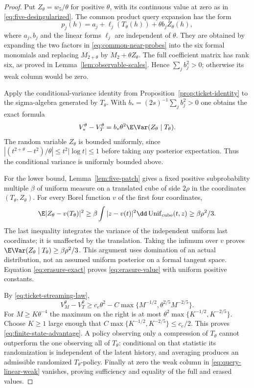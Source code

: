 \begin{proof}
Put $Z_\theta=w_5/\theta$ for positive $\theta$, with its continuous
value at zero as in \eqref{eq:five-desingularized}. The common product
query expansion has the form
\begin{equation}\label{eq:query-linear-weak}
 p_j(h)=a_j+\ell_j(T_\theta(h))+\theta b_jZ_\theta(h),
\end{equation}
where $a_j,b_j$ and the linear forms $\ell_j$ are independent of
$\theta$. They are obtained by expanding the two factors in
\eqref{eq:common-near-probes} into the six formal monomials and replacing
$M_{2+\theta}$ by $M_2+\theta Z_\theta$. The full coefficient matrix
has rank six, as proved in Lemma~\ref{lem:observable-scales}. Hence
$\sum_jb_j^2>0$; otherwise its weak column would be zero.

Apply the conditional-variance identity from
Proposition~\ref{prop:ticket-identity} to the sigma-algebra generated by
$T_\theta$. With $b_*=(2s)^{-1}\sum_jb_j^2>0$ one obtains the exact
formula
\begin{equation}\label{eq:erasure-exact}
 V_*^\theta-V_T^\theta
       =b_*\theta^2\E\Var(Z_\theta\mid T_\theta).
\end{equation}
The random variable $Z_\theta$ is bounded uniformly, since
$|(t^{2+\theta}-t^2)/\theta|\le t^2|\log t|\le1$ before taking
any posterior expectation. Thus the conditional variance is uniformly
bounded above.

For the lower bound, Lemma~\ref{lem:five-patch} gives a fixed positive
subprobability multiple $\beta$ of uniform measure on a translated cube
of side $2\rho$ in the coordinates $(T_\theta,Z_\theta)$. For every
Borel function $v$ of the first four coordinates,
\[
 \E|Z_\theta-v(T_\theta)|^2
 \ge\beta\int|z-v(t)|^2\dd\operatorname{Unif}_{\text{cube}}(t,z)
 \ge\beta\rho^2/3.
\]
The last inequality integrates the variance of the independent uniform
last coordinate; it is unaffected by the translation. Taking the infimum
over $v$ proves
$\E\Var(Z_\theta\mid T_\theta)\ge\beta\rho^2/3$.
This argument uses domination of an actual distribution, not an assumed
uniform posterior on a formal tangent space. Equation
\eqref{eq:erasure-exact} proves \eqref{eq:erasure-value} with uniform
positive constants.

By \eqref{eq:ticket-streaming-law},
\[
 V_M^\theta-V_T^\theta
 \ge c_e\theta^2-C\max\{M^{-1/2},\theta^{2/5}M^{-2/5}\}.
\]
For $M\ge K\theta^{-4}$ the maximum on the right is at most
$\theta^2\max\{K^{-1/2},K^{-2/5}\}$. Choose $K\ge1$ large enough
that $C\max\{K^{-1/2},K^{-2/5}\}\le c_e/2$. This proves
\eqref{eq:finite-state-advantage}. A policy observing only a compression
of $T_\theta$ cannot outperform the one observing all of $T_\theta$:
conditional on that statistic its randomization is independent of the
latent history, and averaging produces an admissible randomized
$T_\theta$-policy. Finally at zero the weak column in
\eqref{eq:query-linear-weak} vanishes, proving sufficiency and equality
of the full and erased values.
\end{proof}

